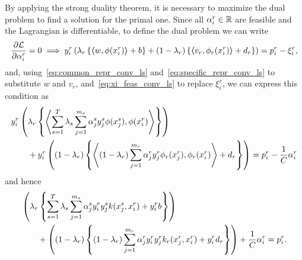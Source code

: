 By applying the strong duality theorem, it is necessary to maximize the dual problem to find a solution for the primal one. Since all $\alpha_i^r \in \mathbb{R}$ are feasible and the Lagrangian is differentiable, to define the dual problem we can write
\begin{equation}
    \nonumber
    \frac{\partial \mathcal{L}}{\partial \alpha_i^r} = 0 \implies y_{i}^r \left(\lambda_r \left\lbrace \bm{\left\langle} w, \phi(x_{i}^r) \bm{\right\rangle} + b  \right\rbrace + (1 - \lambda_r) \left\lbrace \bm{\left\langle} {v}_r, \phi_r(x_{i}^r) \bm{\right\rangle} + d_r \right\rbrace  \right) = p_{i}^r - \xi_{i}^r  ,
\end{equation}
and, using~\eqref{eq:common_repr_conv_ls} and~\eqref{eq:specific_repr_conv_ls} to substitute $w$ and $v_r$, and~\eqref{eq:xi_feas_conv_ls} to replace $\xi_i^r$, we can express this condition as 
\begin{equation}
    \nonumber
    \begin{aligned}
        &y_{i}^r \left(\lambda_r \left\lbrace \left\langle\sum_{s= 1}^T \lambda_s \sum_{j=1}^{m_s} {\alpha_j^s} y_j^s \phi(x_j^s) , \phi(x_{i}^r) \right\rangle  \right\rbrace \right) \\
        &\qquad+ y_{i}^r \left( (1 - \lambda_r) \left\lbrace \left\langle (1 - \lambda_r) \sum_{j=1}^{m_r} {\alpha_j^r}  y_j^r \phi_r(x_j^r) , \phi_r(x_{i}^r) \right\rangle + d_r \right\rbrace  \right) = p_{i}^r - \frac{1}{C}\alpha_{i}^r  \\
    \end{aligned}
\end{equation}
and hence
\begin{equation}
    \nonumber
    \begin{aligned}
        &\left(\lambda_r \left\lbrace \sum_{s= 1}^T \lambda_s \sum_{j=1}^{m_s} {\alpha_j^s} y_{i}^r y_j^s k(x_j^s, x_{i}^r)  + y_i^r b \right\rbrace \right) \\
        &\qquad+  \left( (1 - \lambda_r) \left\lbrace (1 - \lambda_r) \sum_{j=1}^{m_r} {\alpha_j^r} y_{i}^r  y_j^r k_r(x_j^r, x_{i}^r)  + y_i^r d_r \right\rbrace  \right) + \frac{1}{C}\alpha_{i}^r  = p_{i}^r .
    \end{aligned}
\end{equation}

